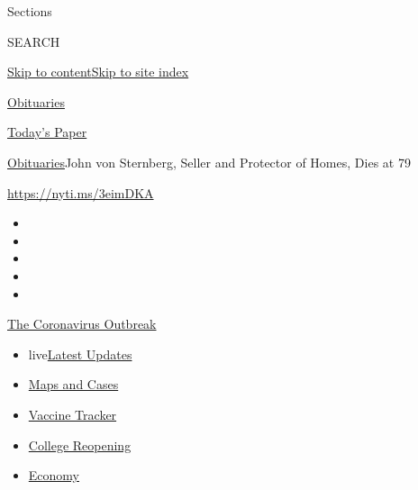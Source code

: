 Sections

SEARCH

\protect\hyperlink{site-content}{Skip to
content}\protect\hyperlink{site-index}{Skip to site index}

\href{https://www.nytimes3xbfgragh.onion/section/obituaries}{Obituaries}

\href{https://myaccount.nytimes3xbfgragh.onion/auth/login?response_type=cookie\&client_id=vi}{}

\href{https://www.nytimes3xbfgragh.onion/section/todayspaper}{Today's
Paper}

\href{/section/obituaries}{Obituaries}\textbar{}John von Sternberg,
Seller and Protector of Homes, Dies at 79

\url{https://nyti.ms/3eimDKA}

\begin{itemize}
\item
\item
\item
\item
\item
\end{itemize}

\href{https://www.nytimes3xbfgragh.onion/news-event/coronavirus?action=click\&pgtype=Article\&state=default\&region=TOP_BANNER\&context=storylines_menu}{The
Coronavirus Outbreak}

\begin{itemize}
\tightlist
\item
  live\href{https://www.nytimes3xbfgragh.onion/2020/08/04/world/coronavirus-covid-19.html?action=click\&pgtype=Article\&state=default\&region=TOP_BANNER\&context=storylines_menu}{Latest
  Updates}
\item
  \href{https://www.nytimes3xbfgragh.onion/interactive/2020/us/coronavirus-us-cases.html?action=click\&pgtype=Article\&state=default\&region=TOP_BANNER\&context=storylines_menu}{Maps
  and Cases}
\item
  \href{https://www.nytimes3xbfgragh.onion/interactive/2020/science/coronavirus-vaccine-tracker.html?action=click\&pgtype=Article\&state=default\&region=TOP_BANNER\&context=storylines_menu}{Vaccine
  Tracker}
\item
  \href{https://www.nytimes3xbfgragh.onion/2020/08/02/us/covid-college-reopening.html?action=click\&pgtype=Article\&state=default\&region=TOP_BANNER\&context=storylines_menu}{College
  Reopening}
\item
  \href{https://www.nytimes3xbfgragh.onion/live/2020/08/03/business/stock-market-today-coronavirus?action=click\&pgtype=Article\&state=default\&region=TOP_BANNER\&context=storylines_menu}{Economy}
\end{itemize}

